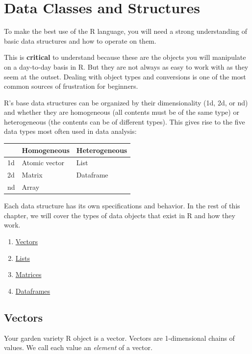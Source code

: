 \documentclass[
]{book}
\providecommand{\tightlist}{%
  \setlength{\itemsep}{0pt}\setlength{\parskip}{0pt}}
\begin{document}
\hypertarget{data-classes-and-structures}{%
\chapter{Data Classes and Structures}\label{data-classes-and-structures}}

To make the best use of the R language, you will need a strong understanding of basic data structures and how to operate on them.

This is \textbf{critical} to understand because these are the objects you will manipulate on a day-to-day basis in R. But they are not always as easy to work with as they seem at the outset. Dealing with object types and conversions is one of the most common sources of frustration for beginners.

R's base data structures can be organized by their dimensionality (1d, 2d, or nd) and whether they are homogeneous (all contents must be of the same type) or heterogeneous (the contents can be of different types). This gives rise to the five data types most often used in data analysis:

\begin{longtable}[]{@{}lll@{}}
\toprule
& Homogeneous & Heterogeneous\tabularnewline
\midrule
\endhead
1d & Atomic vector & List\tabularnewline
2d & Matrix & Dataframe\tabularnewline
nd & Array &\tabularnewline
\bottomrule
\end{longtable}

Each data structure has its own specifications and behavior. In the rest of this chapter, we will cover the types of data objects that exist in R and how they work.

\begin{enumerate}
\def\labelenumi{\arabic{enumi}.}
\tightlist
\item
  \protect\hyperlink{vectors}{Vectors}
\item
  \protect\hyperlink{lists}{Lists}
\item
  \protect\hyperlink{matrices}{Matrices}
\item
  \protect\hyperlink{dataframes}{Dataframes}
\end{enumerate}

\hypertarget{vectors}{%
\section{Vectors}\label{vectors}}

Your garden variety R object is a vector. Vectors are 1-dimensional chains of values. We call each value an \emph{element} of a vector.
\end{document}
